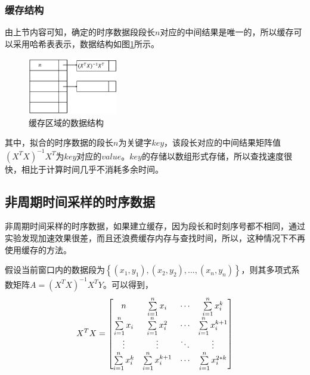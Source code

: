 \subsubsection{缓存结构}
由上节内容可知，确定的时序数据段段长$n$对应的中间结果是唯一的，所以缓存可以采用哈希表表示，数据结构如图\ref{fig:fig41}所示。

\begin{figure}[htb]
	\centering
	\includegraphics[width=0.35\textwidth]{figures/figure4x1}
	\caption{缓存区域的数据结构}\label{fig:fig41}
\end{figure}

其中，拟合的时序数据的段长$n$为关键字$key$，该段长对应的中间结果矩阵值$(X^TX)^{-1}X^T$为$key$对应的$value$。$key$的存储以数组形式存储，所以查找速度很快，相比于计算时间几乎不消耗多余时间。

\subsection{非周期时间采样的时序数据}
非周期时间采样的时序数据，如果建立缓存，因为段长和时刻序号都不相同，通过实验发现加速效果很差，而且还浪费缓存内存与查找时间，所以，这种情况下不再使用缓存的方法。

假设当前窗口内的数据段为${\left \{ (x_1,y_1),(x_2,y_2),..., (x_n,y_n)\right \}}$，则其多项式系数矩阵$A=(X^TX)^{-1}X^TY$。可以得到，
\begin{equation}
X^TX = \begin{bmatrix}
n&{\sum_{i=1}^n \limits x_i}& \cdots & {\sum_{i=1}^n \limits x_i^k} \\
{\sum_{i=1}^n \limits x_i}&{\sum_{i=1}^n \limits x_i^2}& \cdots & {\sum_{i=1}^n \limits x_i^{k+1}}\\
\vdots & \vdots & \ddots & \vdots \\
{\sum_{i=1}^n \limits x_i^k}&{\sum_{i=1}^n \limits x_i^{k+1}}& \cdots & {\sum_{i=1}^n \limits x_i^{2*k}}
\end{bmatrix}
\end{equation}

